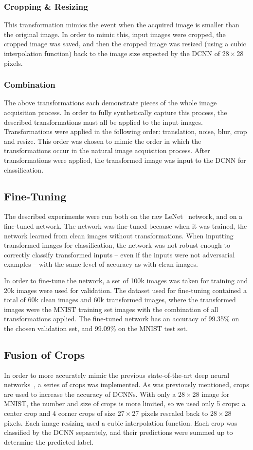 \documentclass[conference]{IEEEtran}
\begin{document}
\subsubsection{Cropping \& Resizing}
This transformation mimics the event when the acquired image is smaller than the original image.  In order to mimic this, input images were cropped, the cropped image was saved, and then the cropped image was resized (using a cubic interpolation function) back to the image size expected by the DCNN of 28\,$\times$\,28 pixels.

\subsubsection{Combination}
The above transformations each demonstrate pieces of the whole image acquisition process.  In order to fully synthetically capture this process, the described transformations must all be applied to the input images.  Transformations were applied in the following order:  translation, noise, blur, crop and resize. This order was chosen to mimic the order in which the transformations occur in the natural image acquisition process.  After transformations were applied, the transformed image was input to the DCNN for classification.

\subsection{Fine-Tuning}
The described experiments were run both on the raw LeNet~\cite{c13} network, and on a fine-tuned network.  The network was fine-tuned because when it was trained, the network learned from clean images without transformations. When inputting transformed images for classification, the network was not robust enough to correctly classify transformed inputs -- even if the inputs were not adversarial examples -- with the same level of accuracy as with clean images.\par
In order to fine-tune the network, a set of 100k images was taken for training and 20k images were used for validation.  The dataset used for fine-tuning contained a total of 60k clean images and 60k transformed images, where the transformed images were the MNIST training set images with the combination of all transformations applied.  The fine-tuned network has an accuracy of 99.35\% on the chosen validation set, and 99.09\% on the MNIST test set.

\subsection{Fusion of Crops}
In order to more accurately mimic the previous state-of-the-art deep neural networks~\cite{c18}, a series of crops was implemented.  As was previously mentioned, crops are used to increase the accuracy of DCNNs.  With only a 28\,$\times$\,28 image for MNIST, the number and size of crops is more limited, so we used only 5 crops:  a center crop and 4 corner crops of size 27\,$\times$\,27 pixels rescaled back to 28\,$\times$\,28 pixels.  Each image resizing used a cubic interpolation function.  Each crop was classified by the DCNN separately, and their predictions were summed up to determine the predicted label.
\end{document}
